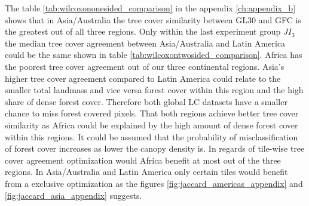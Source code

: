 			The table \ref{tab:wilcoxononesided_comparison} in the appendix \ref{ch:appendix_b} shows that in Asia/Australia the tree cover similarity between \ac{GL30} and \ac{GFC} is the greatest out of all three regions. Only within the last experiment group $JI_3$ the median tree cover agreement between Asia/Australia and Latin America could be the same shown in table \ref{tab:wilcoxontwosided_comparison}. Africa has the poorest tree cover agreement out of our three continental regions. Asia's higher tree cover agreement compared to Latin America could relate to the smaller total landmass and vice versa forest cover within this region and the high share of dense forest cover. Therefore both global \ac{LC} datasets have a smaller chance to miss forest covered pixels. That both regions achieve better tree cover similarity as Africa could be explained by the high amount of dense forest cover within this regions. It could be assumed that the probability of misclassification of forest cover increases as lower the canopy density is. In regards of tile-wise tree cover agreement optimization would Africa benefit at most out of the three regions. In Asia/Australia and Latin America only certain tiles would benefit from a exclusive optimization as the figures \ref{fig:jaccard_americas_appendix} and \ref{fig:jaccard_asia_appendix} suggests.

